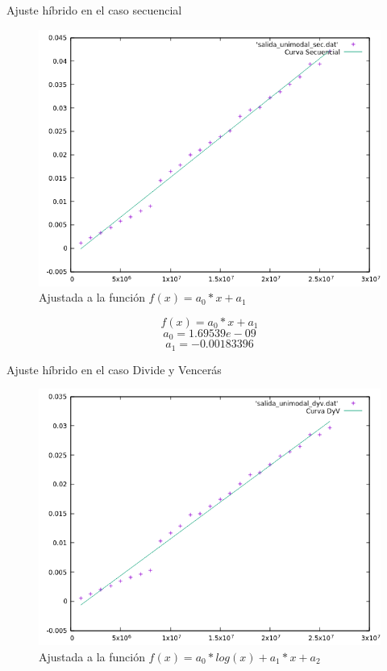 \documentclass[12pt]{beamer}
\begin{document}
\begin{frame}{Ajuste híbrido en el caso secuencial}

\begin{figure}[H] 
\centering
\includegraphics[angle=0,scale=0.5]{img/AjusteHibridoSec.png} 
\caption{Ajustada a la función $f(x)=a_0*x+a_1$} 
\end{figure}

\end{frame}

\begin{frame}
\[
f(x)=a_0*x+a_1 
\]
\[
a_0=1.69539e-09
\]
\[
a_1=-0.00183396
\]
\end{frame}

\begin{frame}{Ajuste híbrido en el caso Divide y Vencerás}

\begin{figure}[H] 
\centering
\includegraphics[angle=0,scale=0.5]{img/AjusteHibridoDyV.png} 
\caption{Ajustada a la función $f(x)=a_0*log(x)+a_1*x+a_2$} 
\end{figure}

\end{frame}
\end{document}
